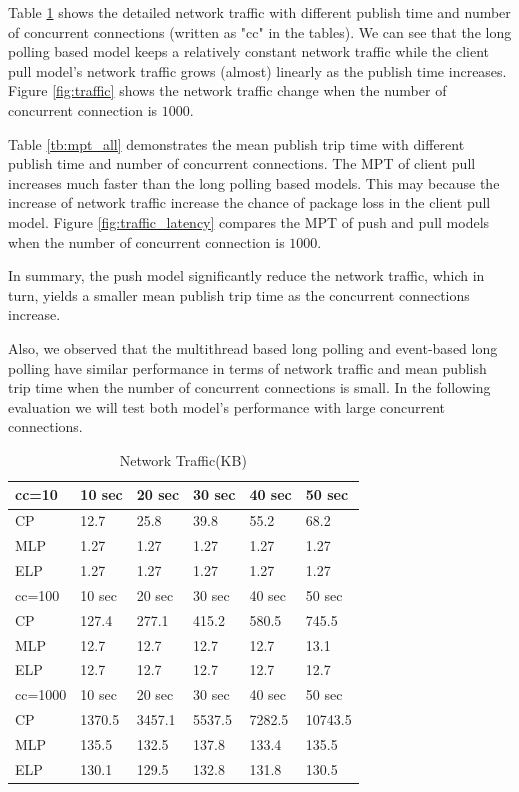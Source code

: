 Table \ref{tb:traffic} shows the detailed network traffic with different 
publish time and number of concurrent connections (written as "cc" 
in the tables).  We can see that the long polling based model keeps 
a relatively constant network traffic while the client pull model's 
network traffic grows (almost) linearly as the publish time increases.
Figure \ref{fig:traffic} shows the network traffic change when the number 
of concurrent connection is $1000$.

Table \ref{tb:mpt_all} demonstrates the mean publish trip time with 
different publish time and number of concurrent connections. The MPT of
client pull increases much faster than the long polling based models.
This may because the increase of network traffic increase the chance
of package loss in the client pull model. 
Figure \ref{fig:traffic_latency} compares the MPT of push and pull models when 
the number of concurrent connection is $1000$.

In summary, the push model significantly reduce the network traffic, which in
turn, yields a smaller mean publish trip time as the concurrent connections 
increase. 

Also, we observed that the multithread based long polling and event-based long 
polling have similar performance in terms of network traffic and mean publish
trip time when the number of concurrent connections is small. In the following
evaluation we will test both model's performance with large concurrent 
connections.

\begin{table}
\centering \caption{\label{tb:traffic} Network Traffic(KB)}
\begin{tabular}{|l|l|l|l|l|l|}
    \hline cc=10& 10 sec & 20 sec & 30 sec & 40 sec & 50 sec \\
    \hline CP & 12.7 & 25.8 & 39.8 & 55.2 & 68.2 \\
    \hline MLP & 1.27 & 1.27 & 1.27 & 1.27 & 1.27 \\
    \hline ELP & 1.27 & 1.27 & 1.27 & 1.27 & 1.27 \\
    \hline
    \hline cc=100& 10 sec & 20 sec & 30 sec & 40 sec & 50 sec \\
    \hline CP & 127.4 & 277.1 & 415.2 & 580.5 & 745.5 \\
    \hline MLP & 12.7 & 12.7 & 12.7 & 12.7 & 13.1 \\
    \hline ELP & 12.7 & 12.7 & 12.7 & 12.7 & 12.7 \\
    \hline
    \hline cc=1000 & 10 sec & 20 sec & 30 sec & 40 sec & 50 sec \\
    \hline CP & 1370.5 & 3457.1 & 5537.5 & 7282.5 & 10743.5 \\
    \hline MLP & 135.5 & 132.5 & 137.8 & 133.4 & 135.5 \\
    \hline ELP & 130.1 & 129.5 & 132.8 & 131.8 & 130.5 \\
    \hline
\end{tabular}
\end{table}

